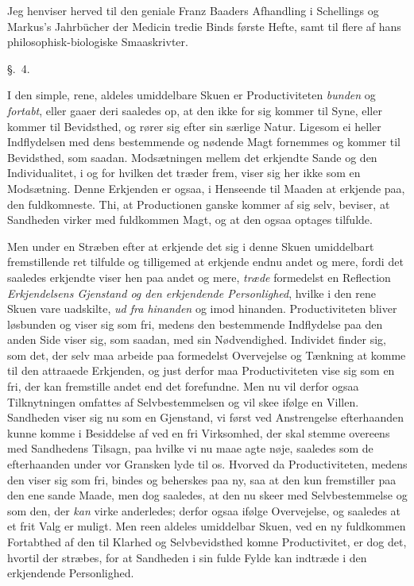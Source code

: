 \documentclass[12pt,a4paper]{book}
\newcommand{\apage}[1]{\marginnote{\footnotesize\textit{[#1]}}}
\begin{document}
Jeg henviser herved til%
 den geniale Franz Baaders Afhandling i Schellings og Markus's Jahrbücher der
Medicin tredie Binds første Hefte, samt til flere af hans
philosophisk-biologiske Smaaskrivter.

\begin{center}\large\S.~4.\end{center} \apage{29} 

I den simple, rene, aldeles umiddelbare Skuen er Productiviteten \emph{bunden} og
\emph{fortabt}, eller gaaer deri saaledes op, at den ikke for sig kommer til
Syne, eller kommer til Bevidsthed, og rører sig efter sin særlige Natur. Ligesom
ei heller Indflydelsen med dens bestemmende og nødende Magt fornemmes og kommer
til Bevidsthed, som saadan. Modsætningen mellem det erkjendte Sande og den
Individualitet, i og for hvilken det træder frem, viser sig her ikke som en
Modsætning. Denne Erkjenden er ogsaa, i Henseende til Maaden at erkjende paa, den
fuldkomneste. Thi, at Productionen ganske kommer af sig selv, beviser, at
Sandheden virker med fuldkommen Magt, og at den ogsaa optages tilfulde.

Men under en Stræben efter at erkjende det sig i denne Skuen umiddelbart
fremstillende ret tilfulde og tilligemed at erkjende endnu andet og mere, fordi
det saaledes erkjendte viser hen paa andet og mere, \emph{træde} formedelst en
Reflection \emph{Erkjendelsens Gjenstand og den erkjendende Personlighed},
hvilke i den rene Skuen vare uadskilte, \emph{ud fra hinanden} og imod hinanden.
Productiviteten bliver løsbunden og viser sig som fri, medens den bestemmende
Indflydelse paa den anden Side viser sig, som saadan, med sin Nødvendighed.
Individet finder sig, som det, der selv maa arbeide paa formedelst Overvejelse og \apage{30} 
Tænkning at komme til den attraaede Erkjenden, og just derfor maa Productiviteten
vise sig som en fri, der kan fremstille andet end det forefundne. Men nu vil
derfor ogsaa Tilknytningen omfattes af Selvbestemmelsen og vil skee ifølge en
Villen. Sandheden viser sig nu som en Gjenstand, vi først ved Anstrengelse
efterhaanden kunne komme i Besiddelse af ved en fri Virksomhed, der skal stemme
overeens med Sandhedens Tilsagn, paa hvilke vi nu maae agte nøje, saaledes som
de efterhaanden under vor Gransken lyde til os. Hvorved da Productiviteten,
medens den viser sig som fri, bindes og beherskes paa ny, saa at den kun
fremstiller paa den ene sande Maade, men dog saaledes, at den nu skeer med
Selvbestemmelse og som den, der \emph{kan} virke anderledes; derfor ogsaa ifølge
Overvejelse, og saaledes at et frit Valg er muligt. Men reen aldeles umiddelbar
Skuen, ved en ny fuldkommen Fortabthed af den til Klarhed og Selvbevidsthed
komne Productivitet, er dog det, hvortil der stræbes, for at Sandheden i sin
fulde Fylde kan indtræde i den erkjendende Personlighed.
\end{document}
